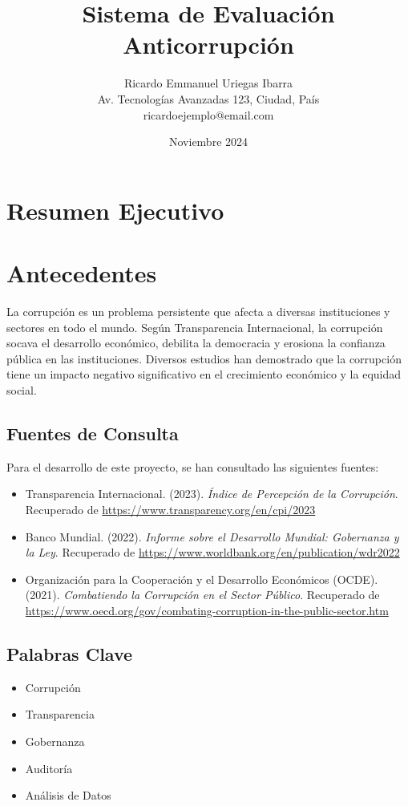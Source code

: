 \documentclass[a4paper,12pt]{article}
\title{\textbf{Sistema de Evaluación Anticorrupción}}
\author{Ricardo Emmanuel Uriegas Ibarra \\ 
Av. Tecnologías Avanzadas 123, Ciudad, País \\ 
ricardoejemplo@email.com}
\date{Noviembre 2024}
\begin{document}
\tableofcontents

\section{Resumen Ejecutivo}

\section{Antecedentes}
La corrupción es un problema persistente que afecta a diversas instituciones y sectores en todo el mundo. Según Transparencia Internacional, la corrupción socava el desarrollo económico, debilita la democracia y erosiona la confianza pública en las instituciones. Diversos estudios han demostrado que la corrupción tiene un impacto negativo significativo en el crecimiento económico y la equidad social.

\subsection{Fuentes de Consulta}
Para el desarrollo de este proyecto, se han consultado las siguientes fuentes:

\begin{itemize}
    \item Transparencia Internacional. (2023). \textit{Índice de Percepción de la Corrupción}. Recuperado de \url{https://www.transparency.org/en/cpi/2023}
    \item Banco Mundial. (2022). \textit{Informe sobre el Desarrollo Mundial: Gobernanza y la Ley}. Recuperado de \url{https://www.worldbank.org/en/publication/wdr2022}
    \item Organización para la Cooperación y el Desarrollo Económicos (OCDE). (2021). \textit{Combatiendo la Corrupción en el Sector Público}. Recuperado de \url{https://www.oecd.org/gov/combating-corruption-in-the-public-sector.htm}
\end{itemize}

\subsection{Palabras Clave}
\begin{itemize}
    \item Corrupción
    \item Transparencia
    \item Gobernanza
    \item Auditoría
    \item Análisis de Datos
\end{itemize}
\end{document}
